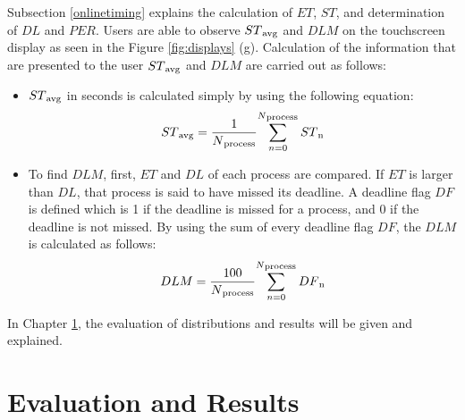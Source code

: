 Subsection \ref{onlinetiming} explains the calculation of ${ET}$, ${ST}$, and determination of ${DL}$ and ${PER}$. Users are able to observe ${ST\textsubscript{avg}}$ and ${DLM}$ on the touchscreen display as seen in the Figure \ref{fig:displays} (g). Calculation of the information that are presented to the user ${ST\textsubscript{avg}}$ and ${DLM}$ are carried out as follows:

\begin{itemize}
	\item ${ST\textsubscript{avg}}$ in seconds is calculated simply by using the following equation:
	\begin{equation}
	ST\textsubscript{avg} =  {\frac{1}{N\textsubscript{process}}} {\sum_{n=0}^{N\textsubscript{process}} ST\textsubscript{n}} 
	\end{equation}
	\item To find ${DLM}$, first, ${ET}$ and ${DL}$ of each process are compared. If ${ET}$ is larger than ${DL}$, that process is said to have missed its deadline. A deadline flag ${DF}$ is defined which is 1 if the deadline is missed for a process, and 0 if the deadline is not missed. By using the sum of every deadline flag ${DF}$, the ${DLM}$ is calculated as follows:
	\begin{equation}
	DLM =  {\frac{100}{N\textsubscript{process}}} {\sum_{n=0}^{N\textsubscript{process}} DF\textsubscript{n}} 
	\end{equation}
\end{itemize}
In Chapter \ref{evaluationchapter}, the evaluation of distributions and results will be given and explained.

\chapter{Evaluation and Results}\label{evaluationchapter}
